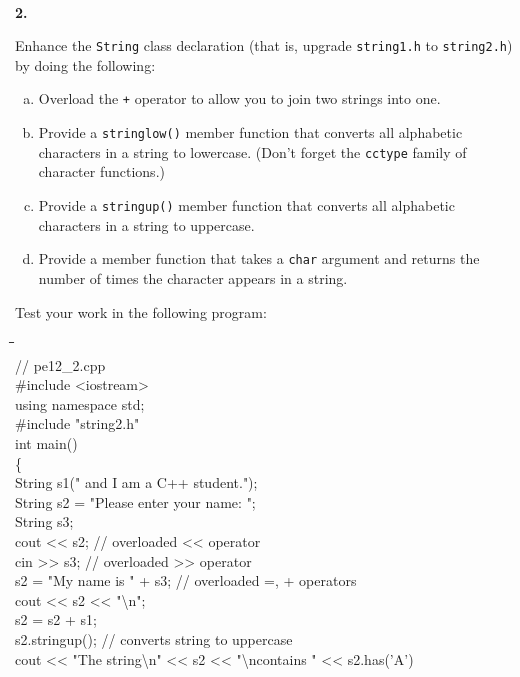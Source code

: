 \documentclass[10 pt]{amsart}
\newlength{\cwidth}
\newenvironment{cpart}[2][\cwidth]
	{%
		\\ %
		\textbf{#2. }%
		\begin{minipage}[t]{#1}%
		\setlength{\parindent}{0pt}%
		\setlength{\parskip}{2ex}%
	}
	{%
		\end{minipage}%
	}
\newcommand{\ttt}[1]{\texttt{#1}}
\newcommand{\tbs}{\textbackslash}
\begin{document}
	\begin{cpart}{2}
		Enhance the \ttt{String} class declaration (that is, upgrade
		\ttt{string1.h} to \ttt{string2.h}) by doing the following:
		\begin{enumerate}[a.]
			\item 
				Overload the \ttt{+} operator to allow you to 
				join two strings into one.
			\item 
				Provide a \ttt{stringlow()} member function that converts
				all alphabetic characters in a string to lowercase.
				(Don't forget the \ttt{cctype} family of character
				functions.)
			\item
				Provide a \ttt{stringup()} member function that converts
				all alphabetic characters in a string to uppercase.
			\item
				Provide a member function that takes a \ttt{char}
				argument and returns the number of times the character
				appears in a string.
		\end{enumerate}
		Test your work in the following program:
		{\ttfamily 
			\begin{tabbing}
				\phantom{\qquad}\=\phantom{\qquad}\=\phantom{\qquad}\=
				\hspace{1cm}\=\hspace{3cm}\= \\
				// pe12\_2.cpp \\
				\#include <iostream> \\
				using namespace std; \\
				\#include "string2.h" \\
				int main() \\
				\{
				\+ \\
				String s1(" and I am a C++ student."); \\
				String s2 = "Please enter your name: "; \\
				String s3; \\
				cout << s2; \> \> \> \> // overloaded << operator \\
				cin >> s3;  \> \> \> \> // overloaded >> operator \\
				s2 = "My name is " + s3; \> \> \> \>
					// overloaded =, + operators \\
				cout << s2 << "\tbs n"; \\
				s2 = s2 + s1; \\
				s2.stringup(); \> \> \> \> \> 
					// converts string to uppercase \\
				cout << "The string\tbs n" << s2 << "\tbs ncontains "
						<< s2.has('A') \\

\end{tabbing}}
\end{cpart}
\end{document}
